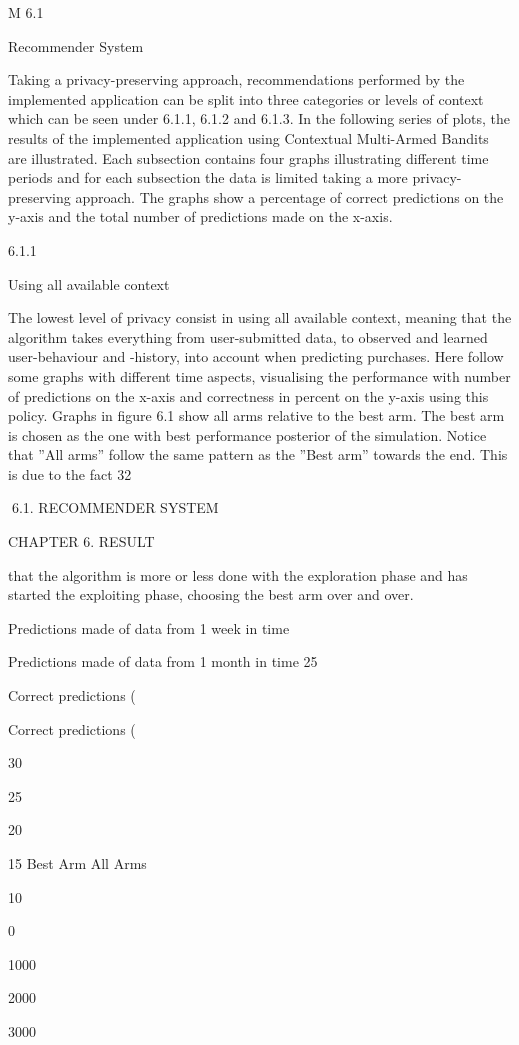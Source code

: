 M
6.1

Recommender System

Taking a privacy-preserving approach, recommendations performed by the implemented
application can be split into three categories or levels of context which can be seen under
6.1.1, 6.1.2 and 6.1.3. In the following series of plots, the results of the implemented
application using Contextual Multi-Armed Bandits are illustrated. Each subsection contains four graphs illustrating different time periods and for each subsection the data is
limited taking a more privacy-preserving approach. The graphs show a percentage of
correct predictions on the y-axis and the total number of predictions made on the x-axis.

6.1.1

Using all available context

The lowest level of privacy consist in using all available context, meaning that the algorithm takes everything from user-submitted data, to observed and learned user-behaviour
and -history, into account when predicting purchases. Here follow some graphs with different time aspects, visualising the performance with number of predictions on the x-axis
and correctness in percent on the y-axis using this policy.
Graphs in figure 6.1 show all arms relative to the best arm. The best arm is chosen
as the one with best performance posterior of the simulation. Notice that ”All arms”
follow the same pattern as the ”Best arm” towards the end. This is due to the fact
32

6.1. RECOMMENDER SYSTEM

CHAPTER 6. RESULT

that the algorithm is more or less done with the exploration phase and has started the
exploiting phase, choosing the best arm over and over.

Predictions made of data from 1 week in time

Predictions made of data from 1 month in time
25

Correct predictions (%

Correct predictions (%

30

25

20

15
Best Arm
All Arms

10

0

1000

2000

3000

